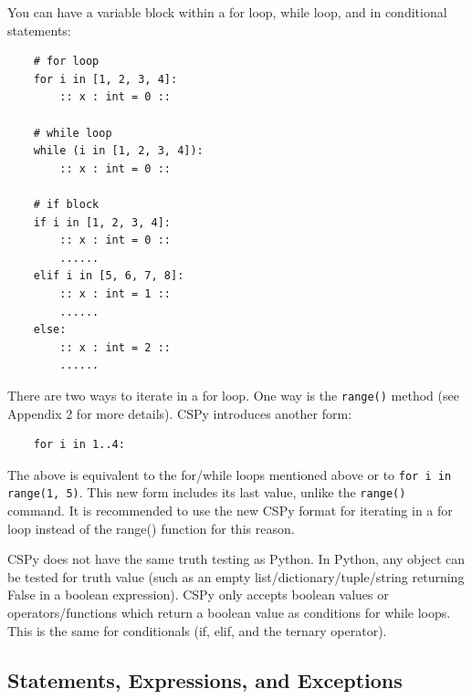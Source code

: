 \documentclass{article}
\begin{document}
You can have a variable block within a for loop, while loop, and in conditional statements:
\begin{verbatim}
    # for loop
    for i in [1, 2, 3, 4]:
        :: x : int = 0 ::

    # while loop
    while (i in [1, 2, 3, 4]):
        :: x : int = 0 ::

    # if block
    if i in [1, 2, 3, 4]:
        :: x : int = 0 ::
        ......
    elif i in [5, 6, 7, 8]:
        :: x : int = 1 ::
        ......
    else:
        :: x : int = 2 ::
        ......    
\end{verbatim}
There are two ways to iterate in a for loop. One way is the \verb|range()| method (see Appendix 2 for more details). CSPy introduces another form: 
\begin{verbatim}
    for i in 1..4: 
\end{verbatim}
The above is equivalent to the for/while loops mentioned above or to \verb|for i in range(1, 5)|. This new form includes its last value, unlike the \verb|range()| command. It is recommended to use the new CSPy format for iterating in a for loop instead of the range() function for this reason.

CSPy does not have the same truth testing as Python. In Python, any object can be tested for truth value (such as an empty list/dictionary/tuple/string returning False in a boolean expression). CSPy only accepts boolean values or operators/functions which return a boolean value as conditions for while loops. This is the same for conditionals (if, elif, and the ternary operator).

\subsection{Statements, Expressions, and Exceptions}
\end{document}

